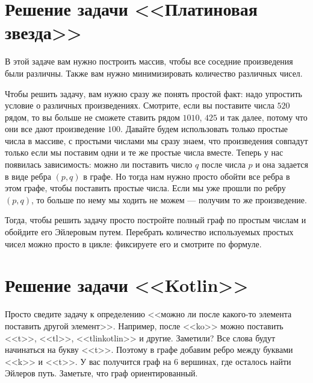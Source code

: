 \documentclass{article}
\begin{document}
\section{Решение задачи <<Платиновая звезда>>}
В этой задаче вам нужно построить массив, чтобы все соседние произведения были различны. Также вам нужно минимизировать количество различных чисел. 

Чтобы решить задачу, вам нужно сразу же понять простой факт: надо упростить условие о различных произведениях. Смотрите, если вы поставите числа $5 20$ рядом, то вы больше не сможете ставить рядом $10 10$, $4 25$ и так далее, потому что они все дают произведение $100$. Давайте будем использовать только простые числа в массиве, с простыми числами мы сразу знаем, что произведения совпадут только если мы поставим одни и те же простые числа вместе. Теперь у нас появилась зависимость: можно ли поставить число $q$ после числа $p$ и она задается в виде ребра $(p,q)$ в графе. Но тогда нам нужно просто обойти все ребра в этом графе, чтобы поставить простые числа. Если мы уже прошли по ребру $(p,q)$, то больше по нему мы ходить не можем --- получим то же произведение. 

Тогда, чтобы решить задачу просто постройте полный граф по простым числам и обойдите его Эйлеровым путем. Перебрать количество используемых простых чисел можно просто в цикле: фиксируете его и смотрите по формуле.

\section{Решение задачи <<Kotlin>>}
Просто сведите задачу к определению <<можно ли после какого-то элемента поставить другой элемент>>. Например, после <<ko>> можно поставить <<t>>, <<tl>>, <<tlinkotlin>> и другие. Заметили? Все слова будут начинаться на букву <<t>>. Поэтому в графе добавим ребро между буквами <<k>> и <<t>>. У вас получится граф на $6$ вершинах, где осталось найти Эйлеров путь. Заметьте, что граф ориентированный.
    
\end{document}
